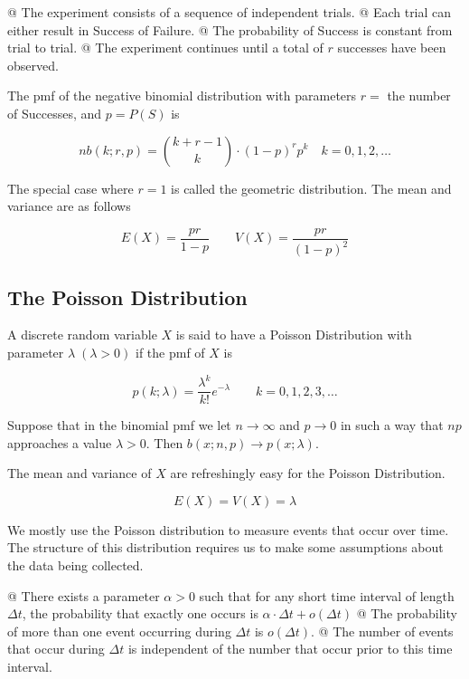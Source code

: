         \NewList
        \begin{easylist}
            @ The experiment consists of a sequence of independent trials.
            @ Each trial can either result in Success of Failure.
            @ The probability of Success is constant from trial to trial.
            @ The experiment continues until a total of $r$ successes have been observed.
        \end{easylist}

    The pmf of the negative binomial distribution with parameters $r = $ the number of Successes, and $p=P(S)$ is

        \[
            nb(k;r,p) = {k+r-1 \choose k}\cdot (1-p)^r p^k \quad k = 0, 1, 2, \ldots
        \]

    The special case where $r=1$ is called the geometric distribution. The mean and variance are as follows

        \[
            E(X) = \frac{pr}{1-p} \qquad V(X) = \frac{pr}{(1-p)^2}
        \]

    \subsection{The Poisson Distribution}
    A discrete random variable $X$ is said to have a Poisson Distribution with parameter $\lambda \; (\lambda > 0)$ if
    the pmf of $X$ is

        \[ p(k; \lambda) = \frac{\lambda^k}{k!} e^{-\lambda} \qquad k = 0, 1, 2, 3, \ldots \]

    Suppose that in the binomial pmf we let $n \to \infty$ and $p \to 0$ in such a way that $np$ approaches a value
    $\lambda > 0$. Then $b(x;n,p)\to p(x;\lambda)$.

    The mean and variance of $X$ are refreshingly easy for the Poisson Distribution.

        \[ E(X) = V(X) = \lambda \]

    We mostly use the Poisson distribution to measure events that occur over time. The structure of this distribution
    requires us to make some assumptions about the data being collected.

        \NewList
        \begin{easylist}
            @ There exists a parameter $\alpha > 0$ such that for any short time interval of length $\Delta t$, the
            probability that exactly one occurs is $\alpha \cdot \Delta t + o(\Delta t)$
            @ The probability of more than one event occurring during $\Delta t$ is $o(\Delta t)$.
            @ The number of events that occur during $\Delta t$ is independent of the number that occur prior to this
            time interval.
        \end{easylist}

